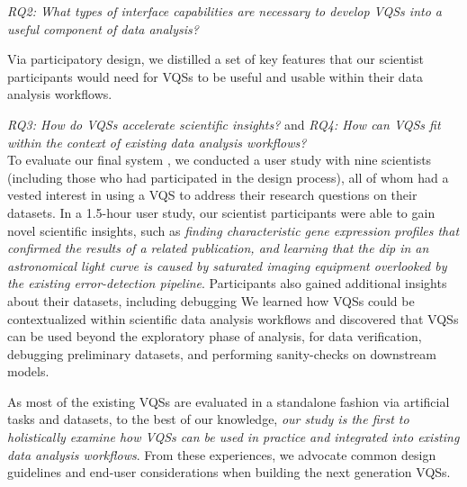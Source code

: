 \noindent \emph{RQ2: What types of interface capabilities are necessary to develop VQSs into a useful component of data analysis?}
\par Via participatory design, we distilled a set of key features that our scientist participants would
need for VQSs to be useful and usable within their data analysis workflows. 

\noindent \emph{RQ3: How do VQSs accelerate scientific insights?} and \emph{RQ4: How can VQSs fit within the context of existing data analysis workflows?}
\\ To evaluate our final system \zv, we conducted a user study with nine scientists (including those who had participated in the design process), all of whom had a vested interest in using a VQS to address their research questions on their datasets. In a 1.5-hour user study, our scientist participants were able to gain novel scientific insights, such as \emph{ finding characteristic gene expression profiles that confirmed the results of a related publication, and learning that the dip in an astronomical light curve is caused by saturated imaging equipment overlooked by the existing error-detection pipeline}.  Participants also gained additional insights about their datasets, including debugging 
We learned how VQSs could be contextualized within scientific data analysis workflows and discovered that VQSs can be used beyond the exploratory phase of analysis, for data verification, debugging preliminary datasets, and performing sanity-checks on downstream models.
\par As most of the existing VQSs are evaluated in a standalone fashion via artificial tasks and datasets, to the best of our knowledge, \emph{our study is the first to holistically examine how VQSs can be used in practice and integrated into existing data analysis workflows}. From these experiences, we advocate common design guidelines and end-user considerations when building the next generation VQSs.